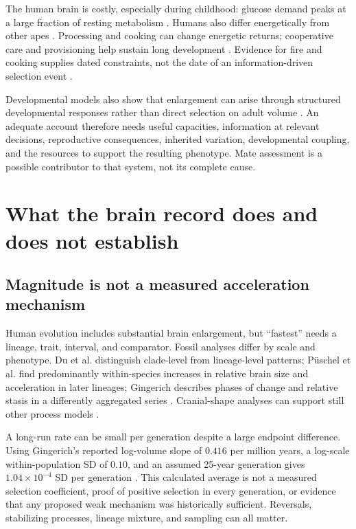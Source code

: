 \documentclass[10pt,twocolumn,letterpaper]{article}
\begin{document}
The human brain is costly, especially during childhood: glucose demand peaks at a large fraction of resting metabolism \citep{kuzawa}. Humans also differ energetically from other apes \citep{pontzer}. Processing and cooking can change energetic returns; cooperative care and provisioning help sustain long development \citep{carmody2011,kaplan,burkart}. Evidence for fire and cooking supplies dated constraints, not the date of an information-driven selection event \citep{berna,zohar}.

Developmental models also show that enlargement can arise through structured developmental responses rather than direct selection on adult volume \citep{evodevo}. An adequate account therefore needs useful capacities, information at relevant decisions, reproductive consequences, inherited variation, developmental coupling, and the resources to support the resulting phenotype. Mate assessment is a possible contributor to that system, not its complete cause.

\section{What the brain record does and does not establish}
\subsection{Magnitude is not a measured acceleration mechanism}
Human evolution includes substantial brain enlargement, but ``fastest'' needs a lineage, trait, interval, and comparator. Fossil analyses differ by scale and phenotype. Du et al. distinguish clade-level from lineage-level patterns; P\"uschel et al. find predominantly within-species increases in relative brain size and acceleration in later lineages; Gingerich describes phases of change and relative stasis in a differently aggregated series \citep{du2018,puschel,gingerich}. Cranial-shape analyses can support still other process models \citep{hubbe}.

A long-run rate can be small per generation despite a large endpoint difference. Using Gingerich's reported log-volume slope of $0.416$ per million years, a log-scale within-population SD of $0.10$, and an assumed 25-year generation gives $1.04\times10^{-4}$ SD per generation \citep{gingerich}. This calculated average is not a measured selection coefficient, proof of positive selection in every generation, or evidence that any proposed weak mechanism was historically sufficient. Reversals, stabilizing processes, lineage mixture, and sampling can all matter.
\end{document}

